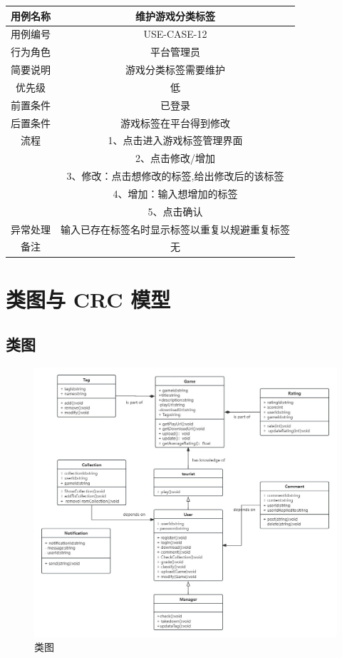 \documentclass[12pt]{ctexart} %
\begin{document}
\begin{tabular}{|c|c|}
  \hline
  用例名称& 维护游戏分类标签\\
  \hline
  用例编号 & USE-CASE-12\\
  \hline
  行为角色 & 平台管理员\\
  \hline
  简要说明 & 游戏分类标签需要维护\\
  \hline
  优先级 & 低\\
  \hline
  前置条件 & 已登录\\
  \hline
  后置条件 & 游戏标签在平台得到修改\\
  \hline
  流程 & 1、点击进入游戏标签管理界面\\
      &  2、点击修改/增加\\
      &  3、修改：点击想修改的标签,给出修改后的该标签\\
      &  4、增加：输入想增加的标签\\
      &  5、点击确认\\
  \hline
  异常处理 &  输入已存在标签名时显示标签以重复以规避重复标签\\
  \hline
  备注 & 无\\
  \hline
\end{tabular}

\section{类图与 CRC 模型}
\subsection{类图}
\begin{figure}[H]
  \centering
  \includegraphics[width=1\textwidth]{lei.jpg}
  \caption{类图}
\end{figure}
\end{document}
